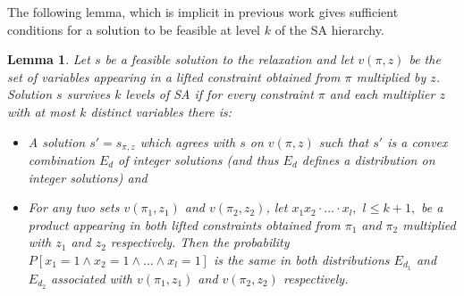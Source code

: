 \documentclass[11pt]{article}
\newtheorem{lemma}{Lemma}[section]
\begin{document}
The following lemma, which is implicit in previous work
\cite{FernandezdlVKM07,GeorgiouMagen} 
 gives sufficient conditions for a solution to be feasible at  level $k$ of the SA hierarchy.

\begin{lemma}\cite{FernandezdlVKM07,GeorgiouMagen}\label{SA-survival}
Let $s$ be  a feasible solution to the relaxation  and let $v(\pi ,z)$
be  the  set  of  variables  appearing  in  a  lifted  constraint
obtained from $\pi$
multiplied by  $z$.  Solution $s$ survives $k$ levels of
SA if  for every constraint $\pi$  and each multiplier $z$  with at most
$k$ distinct variables there is:
\vspace*{-0.2cm}
\begin{itemize}
\item[1] A solution  $s'=s_{\pi,z}$  which agrees with
  $s$  on  $v(\pi ,z)$   such that $s'$
is a convex combination $E_d$ of integer solutions  (and thus $E_d$ defines a distribution on integer solutions) and
\item[2]  For   any  two  sets  $v(\pi_1,z_1)$   and  $v(\pi_2,z_2)$,  let
  $x_1x_2\cdot\ldots\cdot x_{l},$ $l \leq k+1,$ be a product appearing
  in both lifted constraints obtained from $\pi_1$ and $\pi_2$
  multiplied 
  with $z_1$ and $z_2$ respectively.  
Then
  the probability  $P[x_1=1 \wedge x_2=1  \wedge\ldots\wedge x_{l}=1]$ is
  the  same in  both  distributions $E_{d_1}$  and  $E_{d_2}$ associated  with
  $v(\pi_1,z_1)$ and $v(\pi_2,z_2)$ respectively.
\end{itemize}
  \end{lemma}
\end{document}
